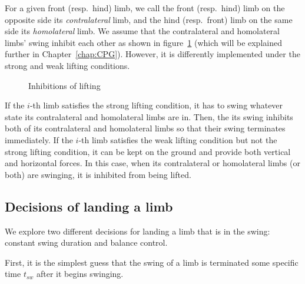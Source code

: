 \documentclass[11pt]{article}
\begin{document}
For a given front (resp.~hind) limb, we call the front (resp.~hind) limb on the opposite side its \textit{contralateral} limb, and the hind (resp.~front) limb on the same side its \textit{homolateral} limb. We assume that the contralateral and homolateral limbs' swing inhibit each other as shown in figure~\ref{fig:CPG} (which will be explained further in Chapter~\ref{chap:CPG}). However, it is differently implemented under the strong and weak lifting conditions.
\begin{figure}[h]
	\centering
	\caption{Inhibitions of lifting}
	\label{fig:CPG}
\end{figure}

If the $ i $-th limb satisfies the strong lifting condition, it has to swing whatever state its contralateral and homolateral limbs are in. Then, the its swing inhibits both of its contralateral and homolateral limbs so that their swing terminates immediately. If the $ i $-th limb satisfies the weak lifting condition but not the strong lifting condition, it can be kept on the ground and provide both vertical and horizontal forces. In this case,  when its contralateral or homolateral limbs (or both) are swinging, it is inhibited from being lifted.




\subsection{Decisions of landing a limb}

We explore two different decisions for landing a limb that is in the swing: constant swing duration and balance control.

First, it is the simplest guess that the swing of a limb is terminated some specific time $ t_{sw} $ after it begins swinging.
\end{document}
